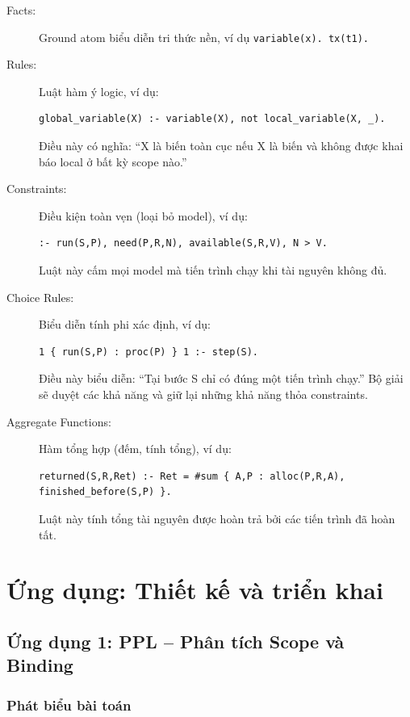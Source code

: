 \documentclass[a4paper,11pt]{article}
\begin{document}
\begin{description}
  \item[Facts:] Ground atom biểu diễn tri thức nền, ví dụ \texttt{variable(x). tx(t1).}
  
  \item[Rules:] Luật hàm ý logic, ví dụ:
    \begin{lstlisting}
global_variable(X) :- variable(X), not local_variable(X, _).
    \end{lstlisting}
    Điều này có nghĩa: ``X là biến toàn cục nếu X là biến và không được khai báo local ở bất kỳ scope nào.''
  
  \item[Constraints:] Điều kiện toàn vẹn (loại bỏ model), ví dụ:
    \begin{lstlisting}
:- run(S,P), need(P,R,N), available(S,R,V), N > V.
    \end{lstlisting}
    Luật này cấm mọi model mà tiến trình chạy khi tài nguyên không đủ.
  
  \item[Choice Rules:] Biểu diễn tính phi xác định, ví dụ:
    \begin{lstlisting}
1 { run(S,P) : proc(P) } 1 :- step(S).
    \end{lstlisting}
    Điều này biểu diễn: ``Tại bước S chỉ có đúng một tiến trình chạy.'' Bộ giải sẽ duyệt các khả năng
    và giữ lại những khả năng thỏa constraints.
  
  \item[Aggregate Functions:] Hàm tổng hợp (đếm, tính tổng), ví dụ:
    \begin{lstlisting}
returned(S,R,Ret) :- Ret = #sum { A,P : alloc(P,R,A), finished_before(S,P) }.
    \end{lstlisting}
    Luật này tính tổng tài nguyên được hoàn trả bởi các tiến trình đã hoàn tất.
\end{description}

  \section{Ứng dụng: Thiết kế và triển khai}\label{sec:applications}

  \subsection{Ứng dụng 1: PPL -- Phân tích Scope và Binding}\label{subsec:ppl}

  \subsubsection*{Phát biểu bài toán}
\end{document}
